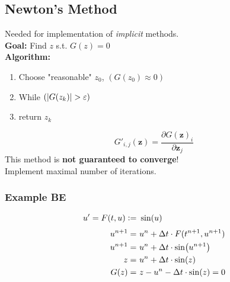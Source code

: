\subsection{Newton's Method}
    Needed for implementation of \textit{implicit} methods.\\[4pt]
    \textbf{Goal:} Find $z$ s.t. $G(z) = 0$\\
    \textbf{Algorithm:}
    \begin{enumerate}
        \item Choose "reasonable" $z_0$, $(G(z_0)\approx0)$
        \item While $\left(\abs{G(z_k)} > \varepsilon\right)$
            \vspace{-7pt}
        \item return $z_k$
    \end{enumerate}
    $$
        G'_{i,j}(\boldsymbol{z})= \frac{\partial G(\boldsymbol{z})_i}{\partial \boldsymbol{z}_j}
    $$
    This method is \textbf{not guaranteed to converge}!\\
    Implement maximal number of iterations.
    \subsubsection{Example BE}
        \vspace{-1em}
        \begin{align*}
            u' = F(t,u) \vcentcolon=&\ \sin(u)\\[3pt]
            u^{n+1} =&\ u^n + \Delta t \cdot F(t^{n+1},u^{n+1})\\
            u^{n+1} =&\ u^n + \Delta t \cdot \sin(u^{n+1})\\
            z =&\ u^n + \Delta t \cdot \sin(z)\\
            G(z) =&\  z - u^n - \Delta t \cdot \sin(z) = 0
        \end{align*}
        
    